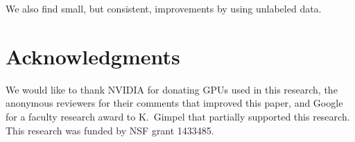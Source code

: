 \documentclass[11pt,a4paper]{article}
\begin{document}
We also find small, but consistent, improvements by using unlabeled data.


\section*{Acknowledgments}
We would like to thank NVIDIA for donating GPUs used in this research, the anonymous reviewers for their comments that improved this paper, and Google for a faculty research award to K.~Gimpel that partially supported this research.
This research was funded by NSF grant 1433485.



\end{document}
